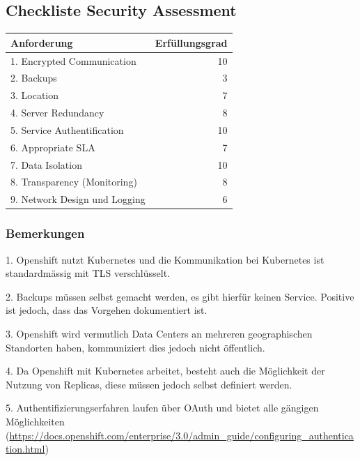\documentclass[12pt,a4paper]{article}
\begin{document}
\subsection{Checkliste Security Assessment}


\begin{table}[H]
    \begin{tabular}{lr}
    \hline
    \textbf{Anforderung}                   & \textbf{Erfüllungsgrad} \\ \hline
    1. Encrypted Communication             & 10                      \\
    2. Backups                             & 3                       \\
    3. Location                            & 7                       \\
    4. Server Redundancy                   & 8                       \\
    5. Service Authentification            & 10                      \\
    6. Appropriate SLA                     & 7                       \\
    7. Data Isolation                      & 10                      \\
    8. Transparency (Monitoring)           & 8                       \\
    9. Network Design und Logging          & 6                       \\ \hline
    \end{tabular}
\end{table}

\subsubsection{Bemerkungen}

1. Openshift nutzt Kubernetes und die Kommunikation bei Kubernetes ist standardmässig mit TLS verschlüsselt.

2. Backups müssen selbst gemacht werden, es gibt hierfür keinen Service. Positive ist jedoch, dass das Vorgehen dokumentiert ist.

3. Openshift wird vermutlich Data Centers an mehreren geographischen Standorten haben, kommuniziert dies jedoch nicht öffentlich.

4. Da Openshift mit Kubernetes arbeitet, besteht auch die Möglichkeit der Nutzung von Replicas, diese müssen jedoch selbst definiert werden.

5. Authentifizierungserfahren laufen über OAuth und bietet alle gängigen Möglichkeiten (\url{https://docs.openshift.com/enterprise/3.0/admin_guide/configuring_authentication.html})
\end{document}
